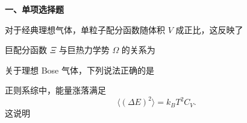 ﻿


\textbf{一、单项选择题}

\begin{question}
对于经典理想气体，单粒子配分函数随体积 $V$ 成正比，这反映了
\begin{choiceoptions}[2]
\end{choiceoptions}

\begin{solution}
\end{solution}
\end{question}
\begin{question}
巨配分函数 $\Xi$ 与巨热力学势 $\Omega$ 的关系为
\begin{choiceoptions}[2]
  \optionitem{$\Omega=\partial \Xi/\partial \mu$}
\end{choiceoptions}

\begin{solution}
\end{solution}
\end{question}
\begin{question}
关于理想 Bose 气体，下列说法正确的是
\begin{choiceoptions}[2]
\end{choiceoptions}

\begin{solution}
\end{solution}
\end{question}
\begin{question}
正则系综中，能量涨落满足
\[
\langle(\Delta E)^2\rangle = k_B T^2 C_V.
\]
这说明
\begin{choiceoptions}[2]
\end{choiceoptions}

\begin{solution}
\end{solution}
\end{question}
